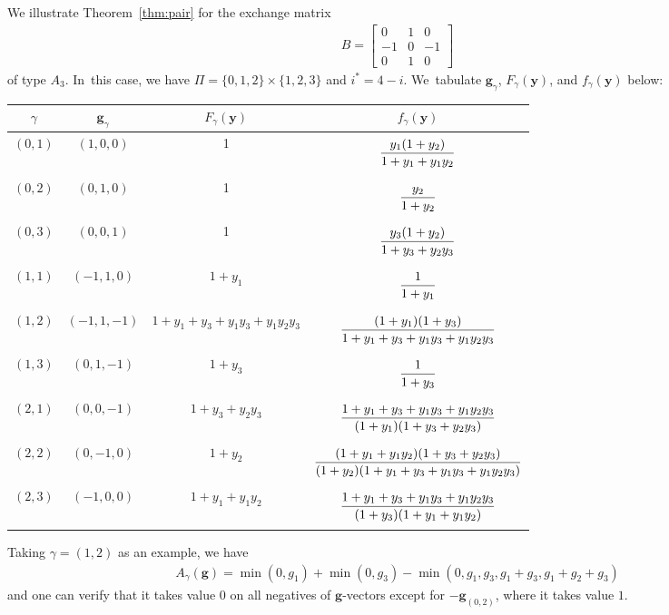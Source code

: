 \documentclass[10pt,a4paper]{amsart}
\def\y{{\mathbf y}}
\def\g{{\mathbf g}}
\numberwithin{equation}{section}
\begin{document}
\begin{Example}\label{ex:A3}
We illustrate Theorem~\ref{thm:pair} for the exchange matrix
\begin{gather*}
B = \begin{bmatrix}
0 & 1 & 0 \\
-1 & 0 & -1 \\
0 & 1 & 0
\end{bmatrix}
\end{gather*}
of type $A_3$. In~this case, we have $\Pi = \{0,1,2\} \times \{1,2,3\}$ and $i^* = 4-i$. We~tabulate $\g_\gamma$, $F_\gamma(\y)$, and $f_\gamma(\y)$ below:
\begin{center}
\setlength{\tabcolsep}{4.0pt}
\renewcommand{\arraystretch}{1.2}
\begin{tabular}{c|c|c|c}
\hline
$\gamma$ & $\g_\gamma$ & $F_\gamma(\y)$ &$f_\gamma(\y)$\\
\hline
$(0,1)$ & $(1,0,0)$ & 1 & $\dfrac{y_1(1+y_2)}{1+y_1+y_1y_2} \vphantom{\Bigg(}$\\
\hline
$(0,2)$ & $(0,1,0)$ & 1 & $\dfrac{y_2}{1+y_2}\vphantom{\Bigg(} $\\
\hline
$(0,3)$ & $(0,0,1)$ & 1 & $\dfrac{y_3(1+y_2)}{1+y_3+y_2y_3}\vphantom{\Bigg(} $\\
\hline
$(1,1)$ & $(-1,1,0)$ & $1+y_1$ & $\dfrac{1}{1+y_1} \vphantom{\Bigg(}$\\
\hline
$(1,2)$ & $(-1,1,-1)$ & $1+y_1+y_3+y_1y_3+y_1y_2y_3$ &$ \dfrac{(1+y_1)(1+y_3)}{1+y_1+y_3+y_1y_3+y_1y_2y_3}\vphantom{\Bigg(} $\\
\hline
$(1,3)$ & $(0,1,-1)$ & $1+y_3$ & $ \dfrac{1}{1+y_3}\vphantom{\Bigg(}$\\
\hline
$(2,1)$ & $(0,0,-1)$ & $1+y_3+y_2y_3$ & $\dfrac{1+y_1+y_3+y_1y_3+y_1y_2y_3}{(1+y_1)(1+y_3+y_2y_3)}\vphantom{\Bigg(}$ \\
\hline
$(2,2)$ & $(0,-1,0)$ & $1+y_2$ & $\dfrac{(1+y_1+y_1y_2)(1+y_3+y_2y_3)}{(1+y_2)(1+y_1+y_3+y_1y_3+y_1y_2y_3)}\vphantom{\Bigg(}$\\
\hline
$(2,3)$ & $(-1,0,0)$ & $1+y_1+y_1y_2$ & $\dfrac{1+y_1+y_3+y_1y_3+y_1y_2y_3}{(1+y_3)(1+y_1+y_1y_2)}\vphantom{\Bigg(}$\\
\hline
\end{tabular}
\end{center}

\noindent
Taking $\gamma = (1,2)$ as an example, we have
\begin{gather*}
A_\gamma(\g) = \min(0,g_1)+\min(0,g_3) - \min(0,g_1,g_3,g_1+g_3,g_1+g_2+g_3)
\end{gather*}
and one can verify that it takes value 0 on all negatives of $\g$-vectors except for $-\g_{(0,2)}$, where it takes value $1$.
\end{Example}
\end{document}
